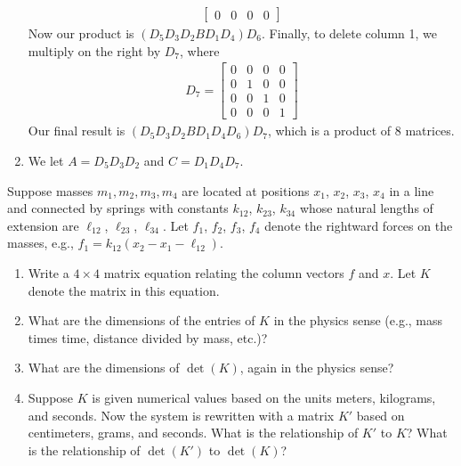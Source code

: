 \documentclass[12pt]{article}
\newenvironment{ex}[2][Exercise]{\begin{trivlist}
		\item[\hskip \labelsep {\bfseries #1}\hskip \labelsep {\bfseries #2.}]}{\end{trivlist}}
\newenvironment{sol}[1][Solution]{\begin{trivlist}
		\item[\hskip \labelsep {\bfseries #1:}]}{\end{trivlist}}
\begin{document}
\begin{sol}
\begin{enumerate}[label=(\alph*)]
\begin{align*}
\begin{bmatrix}
				0 & 0 & 0 & 0
			\end{bmatrix}
		\end{align*}
		Now our product is $(D_5D_3D_2BD_1D_4)D_6$. Finally, to delete column 1, we multiply
		on the right by $D_7$, where
		\begin{align*}
			D_7=\begin{bmatrix}
				0 & 0 & 0 & 0\\
				0 & 1 & 0 & 0\\
				0 & 0 & 1 & 0\\
				0 & 0 & 0 & 1
			\end{bmatrix}
		\end{align*}
		Our final result is $(D_5D_3D_2BD_1D_4D_6)D_7$, which is a product of 8 matrices.
		\item We let $A=D_5D_3D_2$ and $C=D_1D_4D_7$.
	\end{enumerate}
\end{sol}

\begin{ex}{2}
	Suppose masses $m_1,m_2,m_3,m_4$ are located at positions $x_1$, $x_2$, $x_3$, $x_4$ in a line and
	connected by springs with constants $k_{12}$, $k_{23}$, $k_{34}$ whose natural lengths of extension
	are $\ell_{12}$, $\ell_{23}$, $\ell_{34}$. Let $f_1$, $f_2$, $f_3$, $f_4$ denote the rightward forces
	on the masses, e.g., $f_1=k_{12}(x_2-x_1-\ell_{12})$.
	\begin{enumerate}[label=(\alph*)]
		\item Write a $4\times 4$ matrix equation relating the column vectors $f$ and $x$. Let
		$K$ denote the matrix in this equation.
		\item What are the dimensions of the entries of $K$ in the physics sense (e.g., mass times
		time, distance divided by mass, etc.)?
		\item What are the dimensions of $\det(K)$, again in the physics sense?
		\item Suppose $K$ is given numerical values based on the units meters, kilograms, and
		seconds. Now the system is rewritten with a matrix $K'$ based on centimeters, grams,
		and seconds. What is the relationship of $K'$ to $K$? What is the relationship of
		$\det(K')$ to $\det(K)$?
	\end{enumerate}
\end{ex}
\end{document}

